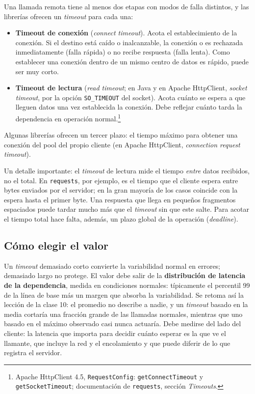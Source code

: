 \documentclass[variant=apuntes,cover=institutional,mode=screen]{ua-engineering-v6-article}
\begin{document}
Una llamada remota tiene al menos dos etapas con modos de falla distintos, y las librerías ofrecen un \emph{timeout} para cada una:
\begin{itemize}
\item \textbf{Timeout de conexión} (\emph{connect timeout}). Acota el establecimiento de la conexión. Si el destino está caído o inalcanzable, la conexión o es rechazada inmediatamente (falla rápida) o no recibe respuesta (falla lenta). Como establecer una conexión dentro de un mismo centro de datos es rápido, puede ser muy corto.
\item \textbf{Timeout de lectura} (\emph{read timeout}; en Java y en Apache HttpClient, \emph{socket timeout}, por la opción \texttt{SO\_TIMEOUT} del socket). Acota cuánto se espera a que lleguen datos una vez establecida la conexión. Debe reflejar cuánto tarda la dependencia en operación normal.\footnote{Apache HttpClient 4.5, \texttt{RequestConfig}: \texttt{getConnectTimeout} y \texttt{getSocketTimeout}; documentación de \texttt{requests}, sección \emph{Timeouts}.}
\end{itemize}
Algunas librerías ofrecen un tercer plazo: el tiempo máximo para obtener una conexión del pool del propio cliente (en Apache HttpClient, \emph{connection request timeout}).

Un detalle importante: el \emph{timeout} de lectura mide el tiempo \emph{entre} datos recibidos, no el total. En \texttt{requests}, por ejemplo, es el tiempo que el cliente espera entre bytes enviados por el servidor; en la gran mayoría de los casos coincide con la espera hasta el primer byte. Una respuesta que llega en pequeños fragmentos espaciados puede tardar mucho más que el \emph{timeout} sin que este salte. Para acotar el tiempo total hace falta, además, un plazo global de la operación (\emph{deadline}).

\subsection{Cómo elegir el valor}

Un \emph{timeout} demasiado corto convierte la variabilidad normal en errores; demasiado largo no protege. El valor debe salir de la \textbf{distribución de latencia de la dependencia}, medida en condiciones normales: típicamente el percentil 99 de la línea de base más un margen que absorba la variabilidad. Se retoma así la lección de la clase 10: el promedio no describe a nadie, y un \emph{timeout} basado en la media cortaría una fracción grande de las llamadas normales, mientras que uno basado en el máximo observado casi nunca actuaría. Debe medirse del lado del cliente: la latencia que importa para decidir cuánto esperar es la que ve el llamante, que incluye la red y el encolamiento y que puede diferir de lo que registra el servidor.
\end{document}
